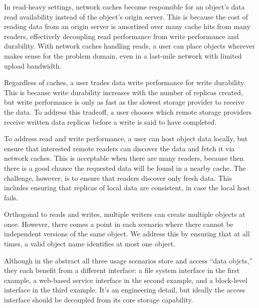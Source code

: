 In read-heavy settings, network caches become responsible for an object's data read availability instead of the object's origin server. This is because the cost of reading data from an origin server is amortized over many cache hits from many readers, effectively decoupling read performance from write performance and durability. With network caches handling reads, a user can place objects wherever makes sense for the problem domain, even in a last-mile network with limited upload bandwidth.

Regardless of caches, a user trades data write performance for write durability. This is because write durability increases with the number of replicas created, but write performance is only as fast as the slowest storage provider to receive the data. To address this tradeoff, a user chooses which remote storage providers receive written data replicas before a write is said to have completed.

To address read and write performance, a user can host object data locally, but ensure that interested remote readers can discover the data and fetch it via network caches. This is acceptable when there are many readers, because then there is a good chance the requested data will be found in a nearby cache.  The challenge, however, is to ensure that readers discover only fresh data.  This includes ensuring that replicas of local data are consistent, in case the local host fails.

Orthogonal to reads and writes, multiple writers can create multiple objects at once. However, there comes a point in each scenario where there cannot be independent versions of the same object. We address this by ensuring that at all times, a valid object name identifies at most one object.

Although in the abstract all three usage scenarios store and access ``data objcts,'' they each benefit from a different interface: a file system interface in the first example, a web-based service interface in the second example, and a block-level interface in the third example. It's an engineering detail, but ideally the access interface should be decoupled from its core storage capability.

